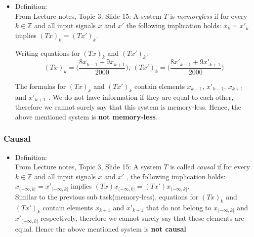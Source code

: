 \documentclass[12pt,a4paper]{article}
\begin{document}
    \begin{itemize}
        \item Definition: \\
        From Lecture notes, Topic 3, Slide 15: A system $T$ is \emph{memoryless} if for every $k\in\mathbb{Z}$ and all input signals $x$ and $x'$ the following implication holds: $x_k=x'_k$ implies $(Tx)_k=(Tx')_k$.
    
        Writing equations for $(Tx)_k$ and $(Tx')_k$:
    $$(Tx)_k=\Big(\frac{8x_{k-1}+9x_{k+1}}{2000}\Big),\ (Tx')_k=\Big(\frac{8x'_{k-1}+9x'_{k+1}}{2000}\Big)$$
    
    The formulas for $(Tx)_k$ and $(Tx')_k$ contain elements $x_{k-1}$, $x'_{k-1}$, $x_{k+1}$ and $x'_{k+1}$ . We do not have information if they are equal to each other, therefore we cannot surely say that this system is memory-less. Hence, the above mentioned system is \textbf{not memory-less}.
    \end{itemize}

\subsubsection{Causal}
    
    \begin{itemize}
        \item Definition: \\
        From Lecture notes, Topic 3, Slide 15: A system $T$ is called \emph{causal} if for every $k\in \mathbb{Z}$ and all input signals $x$ and $x'$ , the following implication holds: $x_{(-\infty,k]}=x'_{(-\infty,k]}$ implies $(Tx)x_{(-\infty,k]}=(Tx')x_{(-\infty,k]}$.
        \\
    
    Similar to the previous sub task(memory-less), equations for $(Tx)_k$ and $(Tx')_k$ contain elements $x_{k+1}$ and $x'_{k+1}$ that do not belong to $x_{(-\infty,k]}$ and $x'_{(-\infty,k]}$ respectively, therefore we cannot surely say that these elements are equal. Hence the above mentioned system is \textbf{not causal}
    \end{itemize}
\end{document}
